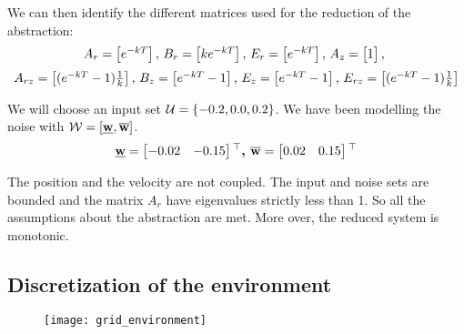 We can then identify the different matrices used for the reduction of the abstraction:
\begin{equation}
A_r =  \begin{bmatrix} e^{-kT} \end{bmatrix} 
\textrm{, }
B_r =  \begin{bmatrix} k e^{-kT} \end{bmatrix} 
\textrm{, }
E_r =  \begin{bmatrix} e^{-kT} \end{bmatrix} 
\textrm{, }
A_z =  \begin{bmatrix} 1 \end{bmatrix} 
\textrm{, }
\end{equation}
\begin{equation}
A_{rz} =  \begin{bmatrix} (e^{-k T} - 1)\frac{1}{k} \end{bmatrix} 
\textrm{, }
B_z =  \begin{bmatrix} e^{-k T} - 1 \end{bmatrix} 
\textrm{, }
E_z =  \begin{bmatrix} e^{-k T} - 1 \end{bmatrix} 
\textrm{, }
E_{rz} =  \begin{bmatrix} (e^{-k T} - 1)\frac{1}{k} \end{bmatrix} 
\end{equation}

We will choose an input set $\mathcal{U} = \{-0.2,0.0,0.2\}$.
We have been modelling the noise with $\mathcal{W} = [\underline{ \mathbf{w}},\overline{ \mathbf{w}}]$.
\begin{equation}
\underline{ \mathbf{w}} = \begin{bmatrix} -0.02&-0.15 \end{bmatrix} {}^\top
\textbf{, }
\overline{ \mathbf{w}} = \begin{bmatrix}  0.02& 0.15 \end{bmatrix} {}^\top
\end{equation}

The position and the velocity are not coupled. The input and noise sets are bounded and the matrix $A_r$ have eigenvalues strictly less than 1. So all the assumptions about the abstraction are met. More over, the reduced system is monotonic.

\subsection{Discretization of the environment}
\begin{figure}
\texttt{[image: grid\_environment]}
\end{figure}
